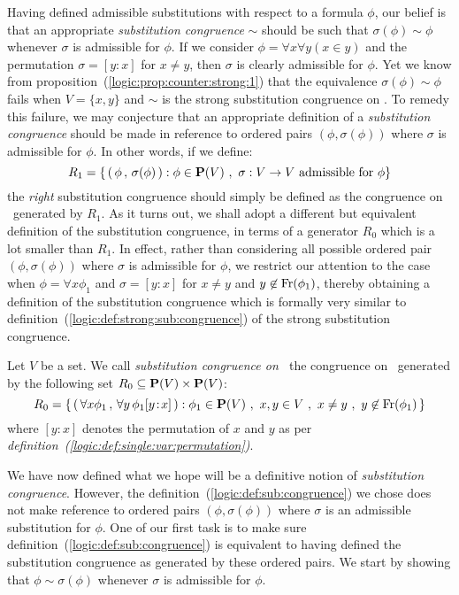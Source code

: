 Having defined admissible substitutions with respect to a formula
$\phi$, our belief is that an appropriate {\em substitution
congruence} $\sim$ should be such that $\sigma(\phi)\sim\phi$
whenever $\sigma$ is admissible for $\phi$. If we consider
$\phi=\forall x\forall y(x \in y)$ and the permutation
$\sigma=[y\!:\!x]$ for $x\neq y$, then $\sigma$ is clearly
admissible for $\phi$. Yet we know from
proposition~(\ref{logic:prop:counter:strong:1}) that the equivalence
$\sigma(\phi)\sim\phi$ fails when $V=\{x,y\}$ and $\sim$ is the
strong substitution congruence on \pv. To remedy this failure, we
may conjecture that an appropriate definition of a {\em substitution
congruence} should be made in reference to ordered pairs
$(\phi,\sigma(\phi))$ where $\sigma$ is admissible for $\phi$. In
other words, if we define:
    \[
    R_{1}=\left\{\,(\,\phi\,,\,\sigma(\phi)\,):\phi\in\pv\ ,\
    \mbox{$\sigma:V\to V$ admissible for $\phi$} \right\}
    \]
the {\em right} substitution congruence should simply be defined as
the congruence on \pv\ generated by $R_{1}$. As it turns out, we
shall adopt a different but equivalent definition of the
substitution congruence, in terms of a generator $R_{0}$ which is a
lot smaller than $R_{1}$. In effect, rather than considering all
possible ordered pair $(\phi,\sigma(\phi))$ where $\sigma$ is
admissible for $\phi$, we restrict our attention to the case when
$\phi=\forall x\phi_{1}$ and $\sigma=[y\!:\!x]$ for $x\neq y$ and
$y\not\in\mbox{\rm Fr}(\phi_{1})$, thereby obtaining a definition of the
substitution congruence which is formally very similar to
definition~(\ref{logic:def:strong:sub:congruence}) of the strong
substitution congruence. 
\begin{defin}\label{logic:def:sub:congruence}
Let $V$ be a set. We call {\em substitution congruence on \pv\ }the
congruence on \pv\ generated by the following set $R_{0}\subseteq
\mbox{${\bf P}(V)$}\times\mbox{${\bf P}(V)$}$:
    \[
    R_{0}=\left\{\,(\,\forall x\phi_{1}\,,\,\forall y\,\phi_{1}[y\!:\!x]\,):
    \phi_{1}\in\pv\ ,\ x,y\in V\ ,\ x\neq y\ ,\ y\not\in\free(\phi_{1})\,\right\}
    \]
where $[y\!:\!x]$ denotes the permutation of $x$ and $y$ as per {\em
definition~(\ref{logic:def:single:var:permutation})}.
\end{defin}

We have now defined what we hope will be a definitive notion of {\em
substitution congruence}. However, the
definition~(\ref{logic:def:sub:congruence}) we chose does not make
reference to ordered pairs $(\phi,\sigma(\phi))$ where $\sigma$ is
an admissible substitution for $\phi$. One of our first task is to
make sure definition~(\ref{logic:def:sub:congruence}) is equivalent
to having defined the substitution congruence as generated by these
ordered pairs. We start by showing that $\phi\sim\sigma(\phi)$
whenever $\sigma$ is admissible for $\phi$.

